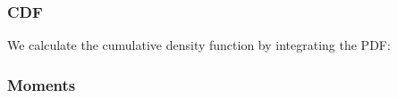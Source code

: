 %
%
%
%
%
%
%
%
%
%
%
%
%
%

\subsubsection{CDF}

We calculate the cumulative density function by integrating the PDF:
\

\subsubsection{Moments}

